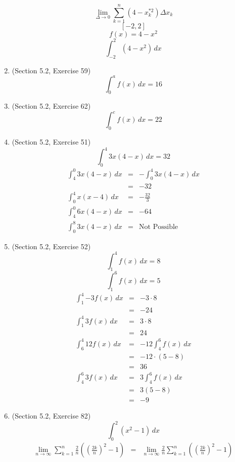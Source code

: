 \documentclass{article}
\begin{document}
\begin{enumerate}
        $$\lim_{\Delta \to 0}{\sum_{k = 1}^n{\left(4 - x_k^{*2}\right)\Delta{x_k}}}$$
        $$[-2,2]$$
        $$f(x) = 4 - x^2$$
        $$\int_{-2}^2{\left(4 - x^2\right)\,dx}$$
    \item (Section 5.2, Exercise 59)
        $$\int_0^a{f(x)\,dx} = 16$$
    \item (Section 5.2, Exercise 62)
        $$\int_0^c{f(x)\,dx} = 22$$
    \item (Section 5.2, Exercise 51)
        $$\int_0^4{3x\left(4 - x\right)\,dx} = 32$$
        \begin{eqnarray}
            \int_4^0{3x\left(4 - x\right)\,dx} &=& -\int_0^4{3x\left(4 - x\right)\,dx} \\
                                               &=& -32 \\
            \int_0^4{x\left(x - 4\right)\,dx} &=& -\frac{32}{3} \\
            \int_4^0{6x\left(4 - x\right)\,dx} &=& -64 \\
            \int_0^8{3x\left(4 - x\right)\,dx} &=& \text{Not Possible}
        \end{eqnarray}
    \item (Section 5.2, Exercise 52)
        $$\int_1^4{f(x)\,dx} = 8$$
        $$\int_1^6{f(x)\,dx} = 5$$
        \begin{eqnarray}
            \int_1^4{-3f(x)\,dx} &=& -3 \cdot 8 \\
                                 &=& -24 \\
            \int_1^4{3f(x)\,dx} &=& 3 \cdot 8 \\
                                &=& 24 \\
            \int_6^4{12f(x)\,dx} &=& -12\int_4^6{f(x)\,dx} \\
                                 &=& -12 \cdot \left(5 - 8\right) \\
                                 &=& 36 \\
            \int_4^6{3f(x)\,dx} &=& 3\int_4^6{f(x)\,dx} \\
                                &=& 3\left(5 - 8\right) \\
                                &=& -9
        \end{eqnarray}
    \item (Section 5.2, Exercise 82)
        $$\int_0^2{\left(x^2 - 1\right)\,dx}$$
        \begin{eqnarray}
            \lim_{n \to \infty}{\sum_{k = 1}^n{\frac{2}{n}\left(\left(\frac{2k}{n}\right)^2 - 1\right)}} &=& \lim_{n \to \infty}{\frac{2}{n}\sum_{k = 1}^n{\left(\left(\frac{2k}{n}\right)^2 - 1\right)}} \\

\end{eqnarray}
\end{enumerate}
\end{document}
